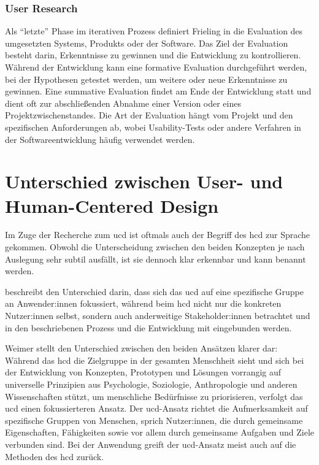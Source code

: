 \documentclass[a4paper,12pt,twoside,numbers=noendperiod]{scrreprt}
\begin{document}
\subsubsection*{User Research}
\label{sub-sub-sec:user-research}

Als \enquote{letzte} Phase im iterativen Prozess definiert Frieling in \cite{frieling_user_2019} die Evaluation des umgesetzten Systems, Produkts oder der Software. Das Ziel der Evaluation besteht darin, Erkenntnisse zu gewinnen und die Entwicklung zu kontrollieren. Während der Entwicklung kann eine formative Evaluation durchgeführt werden, bei der Hypothesen getestet werden, um weitere oder neue Erkenntnisse zu gewinnen. Eine summative Evaluation findet am Ende der Entwicklung statt und dient oft zur abschließenden Abnahme einer Version oder eines Projektzwischenstandes. Die Art der Evaluation hängt vom Projekt und den spezifischen Anforderungen ab, wobei Usability-Tests oder andere Verfahren in der Softwareentwicklung häufig verwendet werden. \cite{frieling_user_2019}

\section{Unterschied zwischen User- und Human-Centered Design}
\label{sec:unterschied-ucd-hcd}

Im Zuge der Recherche zum \acl{ucd} ist oftmals auch der Begriff des \ac{hcd} zur Sprache gekommen. Obwohl die Unterscheidung zwischen den beiden Konzepten je nach Auslegung sehr subtil ausfällt, ist sie dennoch klar erkennbar und kann benannt werden.

\medskip

\cite{ionos_se_user-centered_2022} beschreibt den Unterschied darin, dass sich das \ac{ucd} auf eine spezifische Gruppe an Anwender:innen fokussiert, während beim \ac{hcd} nicht nur die konkreten Nutzer:innen selbst, sondern auch anderweitige Stakeholder:innen betrachtet und in den beschriebenen Prozess und die Entwicklung mit eingebunden werden.

\medskip

Weimer stellt den Unterschied zwischen den beiden Ansätzen klarer dar: Während das \ac{hcd} die Zielgruppe in der gesamten Menschheit sieht und sich bei der Entwicklung von Konzepten, Prototypen und Lösungen vorrangig auf universelle Prinzipien aus Psychologie, Soziologie, Anthropologie und anderen Wissenschaften stützt, um menschliche Bedürfnisse zu priorisieren, verfolgt das \ac{ucd} einen fokussierteren Ansatz. Der \ac{ucd}-Ansatz richtet die Aufmerksamkeit auf spezifische Gruppen von Menschen, sprich Nutzer:innen, die durch gemeinsame Eigenschaften, Fähigkeiten sowie vor allem durch gemeinsame Aufgaben und Ziele verbunden sind. Bei der Anwendung greift der \ac{ucd}-Ansatz meist auch auf die Methoden des \ac{hcd} zurück. \cite{weimer_difference_2022}
\end{document}
